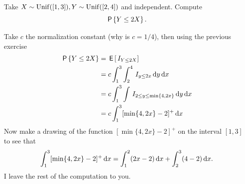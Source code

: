 \documentclass[lectures]{subfiles}
\begin{document}
\begin{exercise}\label{ex:2}
Take $X\sim\Unif{[1,3]}, Y\sim\Unif{[2,4]}$ and independent. Compute
\begin{equation}
  \label{eq:824}
\P{Y\leq 2X}.
\end{equation}
\begin{solution}
Take $c$ the normalization constant (why is $c=1/4$), then using the previous exercise
\begin{align}
\P{Y\leq 2X}
&=\E{\1{Y\leq 2X}} \\
&=c \int_{1}^{3}\int_{2}^{4} \1{y\leq 2x} \d y \d x \\
&=c \int_{1}^{3}\int \1{2\leq y\leq \min\{4,2x\}}  \d y \d x \\
&=c \int_{1}^{3} [\min\{4, 2x\} -2]^{+} \d x
\end{align}
Now make a drawing of the function $[\min\{4, 2x\} - 2]^{+}$ on the interval $[1,3]$ to see that
\begin{equation}
\int_{1}^{3} [\min\{4, 2x\} -2]^{+} \d x = \int_{1}^{2} (2x -2) \d x + \int_{2}^{3} (4 -2) \d x.
\end{equation}
I leave the rest of the computation to you.
\end{solution}
\end{exercise}
\end{document}
